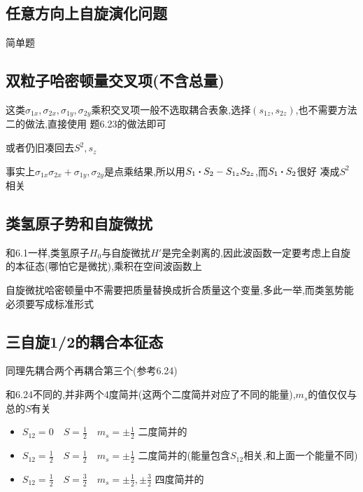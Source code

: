 \documentclass{article}
\begin{document}
        \subsection{任意方向上自旋演化问题}
            简单题

        \subsection{双粒子哈密顿量交叉项(不含总量)}
            这类$\sigma_{1x},\sigma_{2x},\sigma_{1y},\sigma_{2y}$乘积交叉项一般不选取耦合表象,选择$(s_{1z},s_{2z})$,也不需要方法二的做法,直接使用
            题6.23的做法即可

            或者仍旧凑回去$S^{2},s_{z}$

            事实上$\sigma_{1x}\sigma_{2x}+\sigma_{1y},\sigma_{2y}$是点乘结果,所以用$S_{1} \vdot S_{2} - S_{1z}S_{2z}$,而$S_{1} \vdot S_{2}$很好
            凑成$S^{2}$相关

        \subsection{类氢原子势和自旋微扰}
            和6.1一样,类氢原子$H_0$与自旋微扰$H'$是完全剥离的,因此波函数一定要考虑上自旋的本征态(哪怕它是微扰),乘积在空间波函数上

            自旋微扰哈密顿量中不需要把质量替换成折合质量这个变量,多此一举,而类氢势能必须要写成标准形式

        \subsection{三自旋1/2的耦合本征态}
            同理先耦合两个再耦合第三个(参考6.24)

            和6.24不同的,并非两个4度简并(这两个二度简并对应了不同的能量),$m_{s}$的值仅仅与总的$S$有关

            \begin{itemize}
                \item $S_{12} = 0 \quad S = \frac{1}{2} \quad m_{s} = \pm \frac{1}{2}$ 二度简并的
                \item $S_{12} = \frac{1}{2} \quad S = \frac{1}{2} \quad m_{s} = \pm \frac{1}{2}$ 二度简并的(能量包含$S_{12}$相关,和上面一个能量不同)
                \item $S_{12} = \frac{1}{2} \quad S = \frac{3}{2} \quad m_{s} = \pm \frac{1}{2},\pm \frac{3}{2}$ 四度简并的
            \end{itemize}
\end{document}
